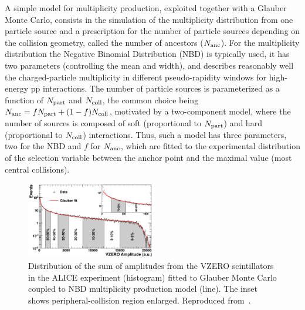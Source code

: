A simple model for multiplicity production, exploited together with a Glauber Monte Carlo, consists in the simulation of the multiplicity distribution from one particle source and a prescription for the number of particle sources depending on the collision geometry, called the number of ancestors ($N_{\rm anc}$). For the multiplicity distribution the Negative Binomial Distribution (NBD) is typically used, it has two parameters (controlling the mean and width), and describes reasonably well the charged-particle multiplicity in different pseudo-rapidity windows for high-energy pp interactions. The number of particle sources is parameterized as a function of $N_{\rm part}$ and $N_{\rm coll}$, the common choice being $N_{\rm anc} = f N_{\rm part} + (1 - f) N_{\rm coll}$, motivated by a two-component model, where the number of sources is composed of soft (proportional to $N_{\rm part}$) and hard (proportional to $N_{\rm coll}$) interactions. Thus, such a model has three parameters, two for the NBD and $f$ for $N_{\rm anc}$, which are fitted to the experimental distribution of the selection variable between the anchor point and the maximal value (most central collisions).

\begin{figure}
\centering
\includegraphics[width=0.5\textwidth]{ksfigures/VZEROCent.pdf}
\caption{Distribution of the sum of amplitudes from the VZERO scintillators in the ALICE experiment (histogram) fitted to Glauber Monte Carlo coupled to NBD multiplicity production model (line). The inset shows peripheral-collision region enlarged. Reproduced from~\cite{Abelev:2013qoq}.}
\label{figks:V0centr}
\end{figure}

